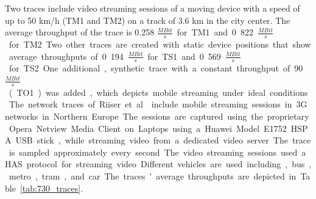 Two traces include video streaming sessions of a moving device with a speed of up to 50 km/h (TM1 and TM2) on a track of 3.6 km in the city center.
The average throughput of the trace is 0.258 \unit{$\frac{MBit}{s}$} for TM1 and 0.822 \unit{$\frac{MBit}{s}$} for TM2.
Two other traces are created with static device positions that show average throughputs of 0.194 \unit{$\frac{MBit}{s}$} for TS1 and 0.569 \unit{$\frac{MBit}{s}$} for TS2.
One additional, synthetic trace with a constant throughput of 90 \unit{$\frac{MBit}{s}$} (TO1) was added, which depicts mobile streaming under ideal conditions.

The network traces of Riiser et al.~\cite{Riiser2013} include mobile streaming sessions in 3G networks in Northern Europe. 
The sessions are captured using the proprietary Opera Netview Media Client on Laptops using a Huawei Model E1752 HSPA USB stick, while streaming video from a dedicated video server.
The trace is sampled approximately every second.
The video streaming sessions used a \ac{HAS} protocol for streaming video.
Different vehicles are used including, bus, metro, tram, and car. 
The traces' average throughputs are depicted in Table~\ref{tab:730_traces}.

